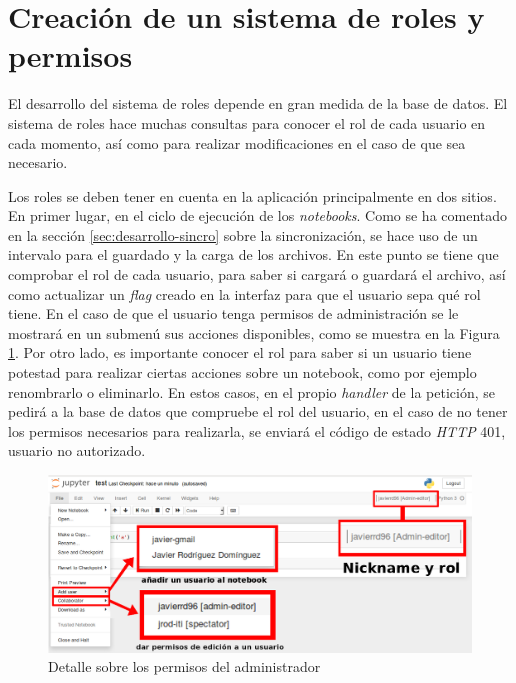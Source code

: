 \documentclass[11pt,spanish,listoffigures]{tfgetsinf}
\begin{document}

\section{Creación de un sistema de roles y permisos}
\label{sec:desarrollo-roles}

El desarrollo del sistema de roles depende en gran medida de la base de datos. El sistema de roles hace muchas consultas para conocer el rol de cada usuario en cada momento, así como para realizar modificaciones en el caso de que sea necesario. 

Los roles se deben tener en cuenta en la aplicación principalmente en dos sitios. En primer lugar, en el ciclo de ejecución de los \textit{notebooks}. Como se ha comentado en la sección \ref{sec:desarrollo-sincro} sobre la sincronización, se hace uso de un intervalo para el guardado y la carga de los archivos. En este punto se tiene que comprobar el rol de cada usuario, para saber si cargará o guardará el archivo, así como actualizar un \textit{\gls{flag}} creado en la interfaz para que el usuario sepa qué rol tiene. En el caso de que el usuario tenga permisos de administración se le mostrará en un submenú sus acciones disponibles, como se muestra en la Figura \ref{fig:detalle-nb}. Por otro lado, es importante conocer el rol para saber si un usuario tiene potestad para realizar ciertas acciones sobre un notebook, como por ejemplo renombrarlo o eliminarlo. En estos casos, en el propio \textit{handler} de la petición, se pedirá a la base de datos que compruebe el rol del usuario, en el caso de no tener los permisos necesarios para realizarla, se enviará el código de estado \textit{HTTP} 401, usuario no autorizado. 

\begin{figure}[H]
	\centering
  	\includegraphics[width=1\textwidth]{detalle-nb.png}
  	\caption{Detalle sobre los permisos del administrador}
  	\label{fig:detalle-nb}
\end{figure}
\end{document}
